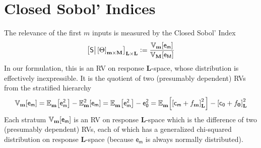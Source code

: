 \documentclass[preprint,12pt]{elsarticle}
\newcommand*{\M}[1]{\ensuremath{#1}\xspace}
\newcommand*{\x}{\times}
\newcommand*{\mi}[1]{\mathbf{#1}}
\newcommand*{\rv}[1]{\mathsf{#1}}
\newcommand*{\te}[2][]{\left\lbrack{#2}\right\rbrack_{#1}}
\newcommand*{\deq}{\M{\mathrel{\mathop:}=}}
\newcommand*{\ev}[3][]{\mathbb{E}_{#3}^{#1}\!\left\lbrack{#2}\right\rbrack}
\newcommand*{\cov}[3][]{\ifthenelse{\equal{#1}{}}{\mathbb{V}_{#3}\!\left\lbrack{#2}\right\rbrack}{\mathbb{V}_{#3}\!\left\lbrack{#2,#1}\right\rbrack}}
\begin{document}
\section{Closed Sobol' Indices} \label{sec:Sobol}
    The relevance of the first $m$ inputs is measured by the Closed Sobol' Index
    \begin{equation} \label{def:Sobol:Sobol}
    \te[\mi{L}\x\mi{L}]{\rv{S} \big\vert \te[\mi{m}\x\mi{M}]{\Theta}} \deq 
    \frac
    {\cov{\rv{e_{m}}}{\mi{m}}}
    {\cov{\rv{e_{M}}}{\mi{M}}}
    \end{equation}
    In our formulation, this is an RV on response $\mi{L}$-space, whose distribution is effectively inexpressible. It is the quotient of two (presumably dependent) RVs from the stratified hierarchy
    \begin{equation*}
    \cov{\rv{e_{m}}}{\mi{m}} = \ev{\rv{e_{m}^{2}}}{\mi{m}} - \ev[2]{\rv{e_{m}}}{\mi{m}} = \ev{\rv{e_{m}^{2}}}{\mi{m}} - \rv{e_{0}^{2}} = \ev{\te[\mi{L}]{\rv{c_{m}} + f_{\mi{m}}}^{2}}{\mi{m}} - \te[\mi{L}]{\rv{c_{0}} + f_{\mi{0}}}^{2}
    \end{equation*}
    Each stratum $\cov{\rv{e_{m}}}{\mi{m}}$ is an RV on response $\mi{L}$-space which is the difference of two (presumably dependent) RVs, each of which has a generalized chi-squared distribution on response $\mi{L}$-space (because $\rv{e_m}$ is always normally distributed).
\end{document}
